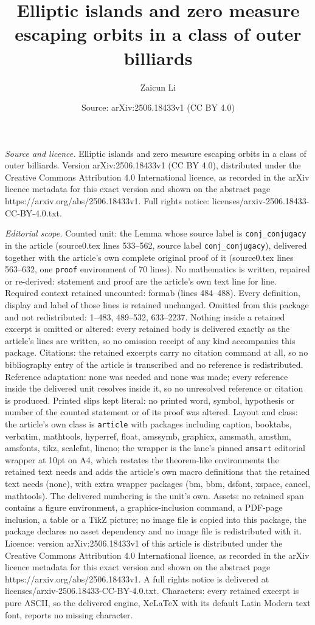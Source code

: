 \documentclass[10pt,a4paper]{amsart}
\title[Elliptic islands and zero measure escaping orbits in a class]{Elliptic islands and zero measure escaping orbits in a class of outer billiards}
\author{Zaicun Li}
\date{Source: arXiv:2506.18433v1 (CC BY 4.0)}
\begin{document}
\maketitle

\noindent\emph{Source and licence.} Elliptic islands and zero measure escaping orbits in a class of outer billiards. Version arXiv:2506.18433v1 (CC BY 4.0), distributed under the Creative Commons Attribution 4.0 International licence, as recorded in the arXiv licence metadata for this exact version and shown on the abstract page https://arxiv.org/abs/2506.18433v1. Full rights notice: licenses/arxiv-2506.18433-CC-BY-4.0.txt.\par\smallskip

\noindent\textit{Editorial scope.} Counted unit: the Lemma whose source label is \texttt{conj\_conjugacy} in the article (source0.tex lines 533--562, source label \texttt{conj\_conjugacy}), delivered together with the article's own complete original proof of it (source0.tex lines 563--632, one \texttt{proof} environment of 70 lines). No mathematics is written, repaired or re-derived: statement and proof are the article's own text line for line. Required context retained uncounted: formab (lines 484--488). Every definition, display and label of those lines is retained unchanged. Omitted from this package and not redistributed: 1--483, 489--532, 633--2237. Nothing inside a retained excerpt is omitted or altered: every retained body is delivered exactly as the article's lines are written, so no omission receipt of any kind accompanies this package. Citations: the retained excerpts carry no citation command at all, so no bibliography entry of the article is transcribed and no reference is redistributed. Reference adaptation: none was needed and none was made; every reference inside the delivered unit resolves inside it, so no unresolved reference or citation is produced. Printed slips kept literal: no printed word, symbol, hypothesis or number of the counted statement or of its proof was altered. Layout and class: the article's own class is \texttt{article} with packages including caption, booktabs, verbatim, mathtools, hyperref, float, amssymb, graphicx, amsmath, amsthm, amsfonts, tikz, scalefnt, lineno; the wrapper is the lane's pinned \texttt{amsart} editorial wrapper at 10pt on A4, which restates the theorem-like environments the retained text needs and adds the article's own macro definitions that the retained text needs (none), with extra wrapper packages (bm, bbm, dsfont, xspace, cancel, mathtools). The delivered numbering is the unit's own. Assets: no retained span contains a figure environment, a graphics-inclusion command, a PDF-page inclusion, a table or a TikZ picture; no image file is copied into this package, the package declares no asset dependency and no image file is redistributed with it. Licence: version arXiv:2506.18433v1 of this article is distributed under the Creative Commons Attribution 4.0 International licence, as recorded in the arXiv licence metadata for this exact version and shown on the abstract page https://arxiv.org/abs/2506.18433v1. A full rights notice is delivered at licenses/arxiv-2506.18433-CC-BY-4.0.txt. Characters: every retained excerpt is pure ASCII, so the delivered engine, XeLaTeX with its default Latin Modern text font, reports no missing character.
\end{document}
